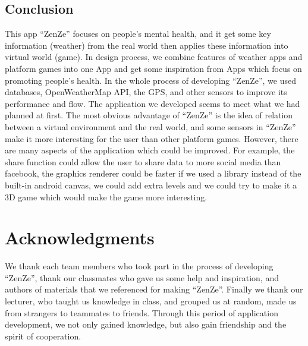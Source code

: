 \documentclass{sigchi}
\begin{document}
\subsection{Conclusion}
This app ``ZenZe'' focuses on people's mental health, and it get some key information (weather) from the real world then applies these information into virtual world (game). In design process, we combine features of weather apps and platform games into one App and get some inspiration from Apps which focus on promoting people's health. In  the whole process of developing ``ZenZe'', we used databases, OpenWeatherMap API, the GPS, and other sensors to improve its performance and flow. The application we developed seems to meet what we had planned at first. The most obvious advantage of ``ZenZe'' is  the idea of relation between a virtual environment and the real world, and some sensors in ``ZenZe'' make it more interesting for the user than other platform games. However, there are many aspects of the application which could be improved. For example, the share function could allow the user to share data to more social media than facebook, the graphics renderer could be faster if we used a library instead of the built-in android canvas, we could add extra levels and we could try to make it a 3D game which would make the game more interesting. 


\section{Acknowledgments}
We thank each team members who took part in the process of developing ``ZenZe'', thank our classmates who gave us some help and inspiration, and authors of materials that we referenced for making ``ZenZe''. Finally we thank our lecturer, who taught us knowledge in class, and grouped us at random, made us from strangers to teammates to friends. Through this period of application development, we not only gained knowledge, but also gain friendship and the spirit of cooperation.

%
%
%
%
%



\end{document}
